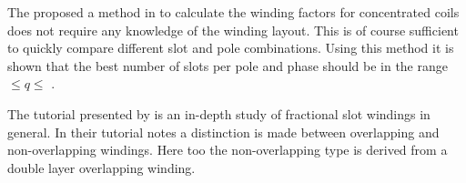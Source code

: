 The proposed a method in \cite{REF-00756} to calculate the winding factors for concentrated coils does not require any knowledge of the winding layout. This is of course sufficient to quickly compare different slot and pole combinations. Using this method it is shown that the best number of slots per pole and phase should be in the range \textonequarter $\leq q\leq$ \textonehalf. 

The tutorial presented by \cite{REF-01056} is an in-depth study of fractional slot windings in general. In their tutorial notes a distinction is made between overlapping and non-overlapping windings. Here too the non-overlapping type is derived from a double layer overlapping winding. 